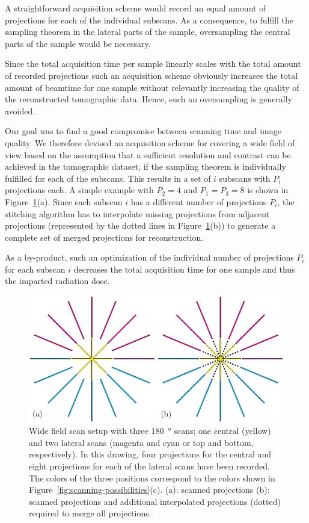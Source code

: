 A straightforward acquisition scheme would record an equal amount of projections for each of the individual subscans. As a consequence, to fulfill the sampling theorem in the lateral parts of the sample, oversampling the central parts of the sample would be necessary.

Since the total acquisition time per sample linearly scales with the total amount of recorded projections such an acquisition scheme obviously increases the total amount of beamtime for one sample without relevantly increasing the quality of the reconstructed tomographic data. Hence, such an oversampling is generally avoided.

Our goal was to find a good compromise between scanning time and image quality. We therefore devised an acquisition scheme for covering a wide field of view based on the assumption that a sufficient resolution and contrast can be achieved in the tomographic dataset, if the sampling theorem is individually fulfilled for each of the subscans. This results in a set of $i$ subscans with $P_{i}$ projections each. A simple example with $P_{2}=4$ and $P_{1}=P_{3}=8$ is shown in Figure~\ref{fig:projections}(a). Since each subscan $i$ has a different number of projections $P_{i}$, the stitching algorithm has to interpolate missing projections from adjacent projections (represented by the dotted lines in Figure~\ref{fig:projections}(b)) to generate a complete set of merged projections for reconstruction.

As a by-product, such an optimization of the individual number of projections $P_{i}$ for each subscan $i$ decreases the total acquisition time for one sample and thus the imparted radiation dose.

\begin{figure}[htb]
	\centering
	\includegraphics[width=\imsize]{img/Haberthuer2010/Fig02-Interpolation}
	\caption[Wide field scan setup]{Wide field scan setup with three \SI{180}{\degree} scans; one central (yellow) and two lateral scans (magenta and cyan or top and bottom, respectively). In this drawing, four projections for the central and eight projections for each of the lateral scans have been recorded. The colors of the three positions correspond to the colors shown in Figure~\ref{fig:scanning-possibilities}(c). %
	(a): scanned projections %
	(b): scanned projections and additional interpolated projections (dotted) required to merge all projections.}
	\label{fig:projections}
\end{figure}	

